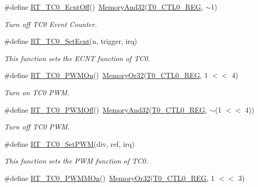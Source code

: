\begin{DoxyCompactItemize}
\#define \mbox{\hyperlink{a00041_a2c4dcae7aa5753dc38986240b024888f}{R\+T\+\_\+\+T\+C0\+\_\+\+Ecnt\+Off}}()~\mbox{\hyperlink{a00020_ad87cedffcaadc51db22594fce55173d4}{Memory\+And32}}(\mbox{\hyperlink{a00020_adadaa0ab1ebbd7ba9b70dfd24c3ed44da869abf9d87f78f45a0e07ad352abb39e}{T0\+\_\+\+C\+T\+L0\+\_\+\+R\+EG}}, $\sim$1)
\begin{DoxyCompactList}\small\item\em Turn off T\+C0 Event Counter. \end{DoxyCompactList}\item 
\#define \mbox{\hyperlink{a00041_a2739dbdedbc45242d873c9ecd9f5f56a}{R\+T\+\_\+\+T\+C0\+\_\+\+Set\+Ecnt}}(n,  trigger,  irq)
\begin{DoxyCompactList}\small\item\em This function sets the E\+C\+NT function of T\+C0. \end{DoxyCompactList}\item 
\#define \mbox{\hyperlink{a00041_a70e69675d0a4e7d5095f938dffa14779}{R\+T\+\_\+\+T\+C0\+\_\+\+P\+W\+M\+On}}()~\mbox{\hyperlink{a00020_a27874a97deab7cecdde5ddecf466e31e}{Memory\+Or32}}(\mbox{\hyperlink{a00020_adadaa0ab1ebbd7ba9b70dfd24c3ed44da869abf9d87f78f45a0e07ad352abb39e}{T0\+\_\+\+C\+T\+L0\+\_\+\+R\+EG}}, 1 $<$$<$ 4)
\begin{DoxyCompactList}\small\item\em Turn on T\+C0 P\+WM. \end{DoxyCompactList}\item 
\#define \mbox{\hyperlink{a00041_a043d535ff9aad665ddf1521169a0f187}{R\+T\+\_\+\+T\+C0\+\_\+\+P\+W\+M\+Off}}()~\mbox{\hyperlink{a00020_ad87cedffcaadc51db22594fce55173d4}{Memory\+And32}}(\mbox{\hyperlink{a00020_adadaa0ab1ebbd7ba9b70dfd24c3ed44da869abf9d87f78f45a0e07ad352abb39e}{T0\+\_\+\+C\+T\+L0\+\_\+\+R\+EG}}, $\sim$(1 $<$$<$ 4))
\begin{DoxyCompactList}\small\item\em Turn off T\+C0 P\+WM. \end{DoxyCompactList}\item 
\#define \mbox{\hyperlink{a00041_a055e471dbfe89e577e92a0789a2c6ae5}{R\+T\+\_\+\+T\+C0\+\_\+\+Set\+P\+WM}}(div,  ref,  irq)
\begin{DoxyCompactList}\small\item\em This function sets the P\+WM function of T\+C0. \end{DoxyCompactList}\item 
\#define \mbox{\hyperlink{a00041_aac1f2943fc99c1197cda6bc5c0fce669}{R\+T\+\_\+\+T\+C0\+\_\+\+P\+W\+M\+M\+On}}()~\mbox{\hyperlink{a00020_a27874a97deab7cecdde5ddecf466e31e}{Memory\+Or32}}(\mbox{\hyperlink{a00020_adadaa0ab1ebbd7ba9b70dfd24c3ed44da869abf9d87f78f45a0e07ad352abb39e}{T0\+\_\+\+C\+T\+L0\+\_\+\+R\+EG}}, 1 $<$$<$ 3)
$$
\end{DoxyCompactItemize}
